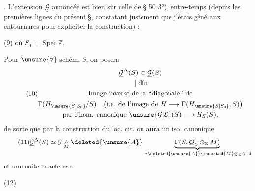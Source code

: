 
. L'extension $\underline{\mathcal G}$ annoncée est bien sûr celle de § 50 3°),  entre-temps (depuis les premières lignes du présent §, constatant justement que j'étais gêné aux entournures pour expliciter la construction) :

(9)\quad{}
où $S_0=\operatorname{Spec}\mathbb Z$.

Pour $\unsure{\forall}$ schém. $S$, on posera
\[
\tag{10}
\begin{gathered}
\underline{\mathcal G}^{\Delta}(S)\subset\underline{\mathcal G}(S)\\
\Vert\;\mathrm{dfn}\\
\text{Image inverse de la ``diagonale'' de}\\
\Gamma(H_{\unsure{S|S_0}}/S)
\quad\bigl(\text{i.e. de l'image de }H\longrightarrow\Gamma(H_{\unsure{S|S_0}},S)\bigr)\\
\text{par l'hom. canonique }\underline{\unsure{\mathcal G|\mathcal E}}(S)\longrightarrow H_S(S),
\end{gathered}
\]
de sorte que par la construction du loc. cit. on aura un iso. canonique
\[
\tag{11}
\underline{\mathcal G}^{\Delta}(S)\simeq
\mathcal G\underset{M}{\wedge}\deleted{\unsure{A}}
\underbrace{\Gamma(S,\underline{\mathcal O}_S\otimes_{\mathbb Z}M)}_{
\simeq\deleted{\unsure{A}}\inserted{M}\otimes_{\mathbb Z}A\ \text{si}}
\]
et une suite exacte can.

(12)\quad{}


